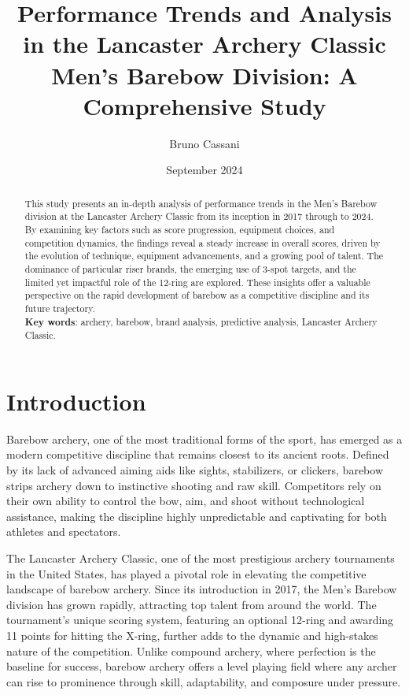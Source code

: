 \documentclass{article}
\title{Performance Trends and Analysis in the Lancaster Archery Classic Men's Barebow Division: A Comprehensive Study}
\author{Bruno Cassani}
\date{September 2024}
\begin{document}
\maketitle %


\begin{abstract}
This study presents an in-depth analysis of performance trends in the Men's Barebow division at the Lancaster Archery Classic from its inception in 2017 through to 2024. By examining key factors such as score progression, equipment choices, and competition dynamics, the findings reveal a steady increase in overall scores, driven by the evolution of technique, equipment advancements, and a growing pool of talent. The dominance of particular riser brands, the emerging use of 3-spot targets, and the limited yet impactful role of the 12-ring are explored. These insights offer a valuable perspective on the rapid development of barebow as a competitive discipline and its future trajectory.\\
\textbf{Key words}: archery, barebow, brand analysis, predictive analysis, Lancaster Archery Classic.

\end{abstract}

\tableofcontents

\newpage
\section{Introduction}
Barebow archery, one of the most traditional forms of the sport, has emerged as a modern competitive discipline that remains closest to its ancient roots. Defined by its lack of advanced aiming aids like sights, stabilizers, or clickers, barebow strips archery down to instinctive shooting and raw skill. Competitors rely on their own ability to control the bow, aim, and shoot without technological assistance, making the discipline highly unpredictable and captivating for both athletes and spectators.

The Lancaster Archery Classic, one of the most prestigious archery tournaments in the United States, has played a pivotal role in elevating the competitive landscape of barebow archery. Since its introduction in 2017, the Men's Barebow division has grown rapidly, attracting top talent from around the world. The tournament’s unique scoring system, featuring an optional 12-ring and awarding 11 points for hitting the X-ring, further adds to the dynamic and high-stakes nature of the competition. Unlike compound archery, where perfection is the baseline for success, barebow archery offers a level playing field where any archer can rise to prominence through skill, adaptability, and composure under pressure.
\end{document}
